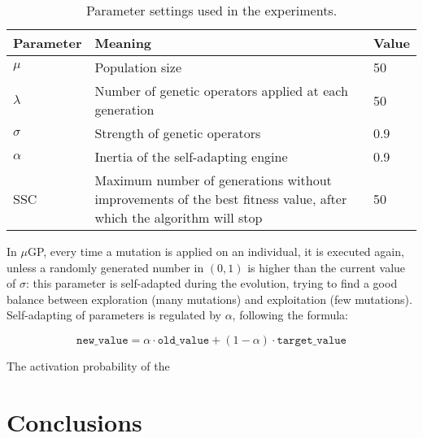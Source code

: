 \documentclass[]{article}
\begin{document}
\begin{table}[htb]
\centering
\caption{Parameter settings used in the experiments.}
\label{table:settings}
\begin{tabular}{|l|p{7cm}|p{2cm}|}
\hline
{\bf Parameter}  & {\bf Meaning} 			& {\bf Value}\\ \hline
$\mu$            & Population size         & 50                                 \\ \hline
$\lambda$        & Number of genetic operators applied at each generation         & 50                                 \\ \hline
$\sigma$         & Strength of genetic operators         & 0.9                                \\ \hline
$\alpha$ & Inertia of the self-adapting engine       & 0.9                                \\ \hline
SSC & Maximum number of generations without improvements of the best fitness value, after which the algorithm will stop & 50 \\ \hline
\end{tabular}
\end{table}

In $\mu$GP, every time a mutation is applied on an individual, it is executed again, unless a randomly generated number in $(0,1)$ is higher than the current value of $\sigma$: this parameter is self-adapted during the evolution, trying to find a good balance between exploration (many mutations) and exploitation (few mutations). Self-adapting of parameters is regulated by $\alpha$, following the formula:

\begin{equation}
\texttt{new\_value} = \alpha \cdot \texttt{old\_value} + (1 - \alpha) \cdot \texttt{target\_value}
\end{equation}

The activation probability of the 

\section{Conclusions}



\end{document}
